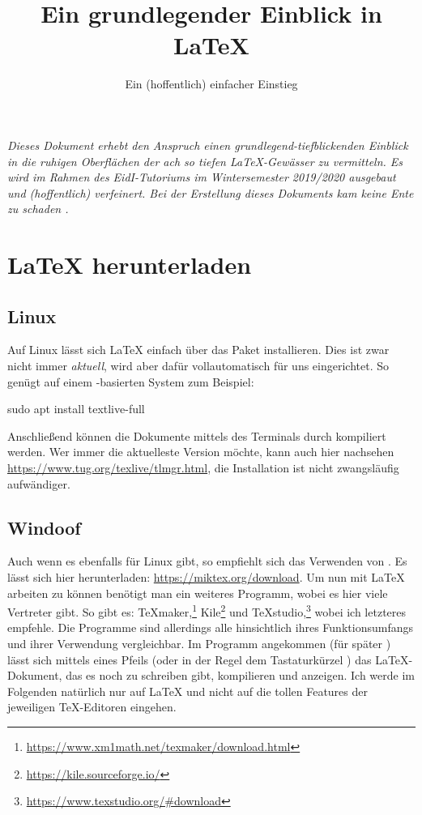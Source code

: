 \documentclass{pnp-skywrath-documentclass/pnp-skywrath}
\title{Ein grundlegender Einblick in \LaTeX}
\subtitle{Ein (hoffentlich) einfacher Einstieg}
\begin{document}
\maketitle
\TableOfContents

\textit{Dieses Dokument erhebt den Anspruch einen grundlegend-tiefblickenden Einblick in die ruhigen Oberflächen der ach so tiefen \LaTeX-Gewässer zu vermitteln. Es wird im Rahmen des EidI-Tutoriums im Wintersemester 2019/2020 ausgebaut und (hoffentlich) verfeinert. Bei der Erstellung dieses Dokuments kam keine Ente zu schaden \tduck.}

\section{\LaTeX{} herunterladen}
\subsection{\faLinux{~} Linux}

Auf Linux lässt sich \LaTeX{} einfach über das Paket  installieren. Dies ist zwar nicht immer \emph{aktuell}, wird aber dafür vollautomatisch für uns eingerichtet. So genügt auf einem -basierten System zum Beispiel:
\begin{bash*}
sudo apt install textlive-full
\end{bash*}
Anschließend können die Dokumente mittels des Terminals durch  kompiliert werden.\newline
Wer immer die aktuelleste Version möchte, kann auch hier nachsehen \url{https://www.tug.org/texlive/tlmgr.html}, die Installation ist nicht zwangsläufig aufwändiger.

\subsection{\faWindows{~} Windoof}

Auch wenn es  ebenfalls für Linux gibt, so empfiehlt sich das Verwenden von . Es lässt sich hier herunterladen: \url{https://miktex.org/download}. Um nun mit \LaTeX{} arbeiten zu können benötigt man ein weiteres Programm, wobei es hier viele Vertreter gibt. So gibt es: TeXmaker,\footnote{\url{https://www.xm1math.net/texmaker/download.html}} Kile\footnote{\url{https://kile.sourceforge.io/}} und TeXstudio,\footnote{\url{https://www.texstudio.org/\#download}} wobei ich letzteres empfehle. Die Programme sind allerdings alle hinsichtlich ihres Funktionsumfangs und ihrer Verwendung vergleichbar. Im Programm angekommen (für später \Smiley) lässt sich mittels eines Pfeils (oder in der Regel dem Tastaturkürzel ) das \LaTeX-Dokument, das es noch zu schreiben gibt, kompilieren und anzeigen. Ich werde im Folgenden natürlich nur auf \LaTeX{} und nicht auf die tollen Features der jeweiligen \TeX-Editoren eingehen.
\end{document}
